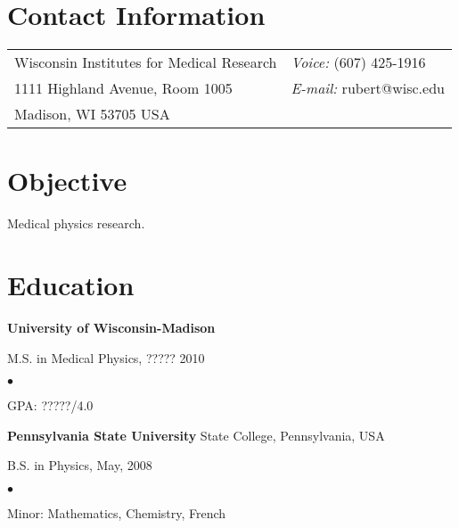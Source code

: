 \documentclass[margin,line]{res}
\newenvironment{list1}{
  \begin{list}{\ding{113}}{%
      \setlength{\itemsep}{0in}
      \setlength{\parsep}{0in} \setlength{\parskip}{0in}
      \setlength{\topsep}{0in} \setlength{\partopsep}{0in}
      \setlength{\leftmargin}{0.17in}}}{\end{list}}
\newenvironment{list2}{
  \begin{list}{$\bullet$}{%
      \setlength{\itemsep}{0in}
      \setlength{\parsep}{0in} \setlength{\parskip}{0in}
      \setlength{\topsep}{0in} \setlength{\partopsep}{0in}
      \setlength{\leftmargin}{0.2in}}}{\end{list}}
\begin{document}

\begin{resume}
\section{\sc Contact Information}
\vspace{.05in}
\begin{tabular}{@{}p{3in}p{4in}}
Wisconsin Institutes for Medical Research & {\it Voice:} (607) 425-1916 \\
1111 Highland Avenue, Room 1005 & {\it E-mail:} rubert@wisc.edu \\
Madison, WI 53705 USA \\
\end{tabular}


\section{\sc Objective}
Medical physics research.

\section{\sc Education}
{\bf University of Wisconsin-Madison} \\
\vspace*{-.1in}
\begin{list1}
\item[] M.S. in Medical Physics, ????? 2010
\begin{list2}
\vspace*{.05in}
\item GPA: ?????/4.0
\end{list2}
\vspace*{.05in}

\end{list1}

{\bf Pennsylvania State University} State College, Pennsylvania, USA\\
\vspace*{-.1in}
\begin{list1}
\item[] B.S. in Physics, May, 2008

\begin{list2}
 \vspace*{.05in}
 \item Minor: Mathematics, Chemistry, French
\end{list2}
\end{list1}


\end{resume}
\end{document}
